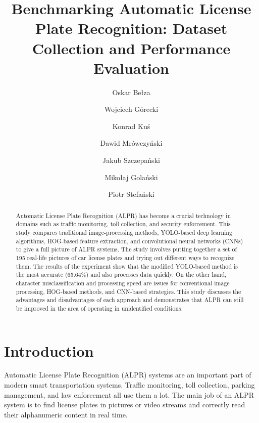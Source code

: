 \documentclass[runningheads]{llncs}
\begin{document}
%
\title{Benchmarking Automatic License Plate Recognition: Dataset Collection and Performance Evaluation}
%
%
\author{Oskar Bełza \and
Wojciech Górecki \and
Konrad Kuś \and
Dawid Mrówczyński \and
Jakub Szczepański \and
Mikołaj Golański\and
Piotr Stefański}
%
%
%
\maketitle              %
%
\begin{abstract}

Automatic License Plate Recognition (ALPR) has become a crucial technology in domains such as traffic monitoring, toll collection, and security enforcement. This study compares traditional image-processing methods, YOLO-based deep learning algorithms, HOG-based feature extraction, and convolutional neural networks (CNNs) to give a full picture of ALPR systems. The study involves putting together a set of 195 real-life pictures of car license plates and trying out different ways to recognize them. The results of the experiment show that the modified YOLO-based method is the most accurate (65.64\%) and also processes data quickly. On the other hand, character misclassification and processing speed are issues for conventional image processing, HOG-based methods, and CNN-based strategies. This study discusses the advantages and disadvantages of each approach and demonstrates that ALPR can still be improved in the area of operating in unidentified conditions.

\end{abstract}
%
%
%

\section{Introduction}

Automatic License Plate Recognition (ALPR) systems are an important part of modern smart transportation systems. Traffic monitoring, toll collection, parking management, and law enforcement all use them a lot. The main job of an ALPR system is to find license plates in pictures or video streams and correctly read their alphanumeric content in real time.
\end{document}
